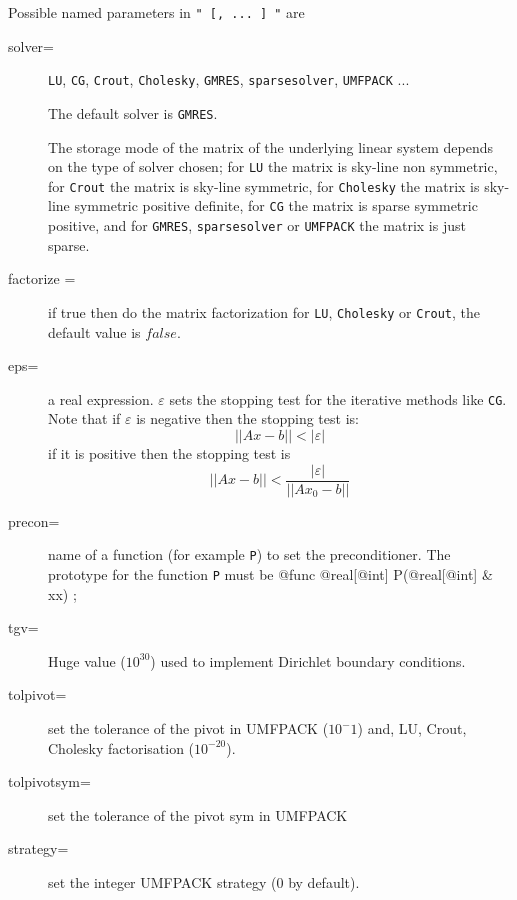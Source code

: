 \documentclass[a4paper,twoside,12pt]{book}
\begin{document}
Possible named parameters in \texttt{" [, ... ] "} are
\begin{description}
    \item[solver=]   \texttt{LU}, \texttt{CG}, 
    \texttt{Crout}, \texttt{Cholesky}, \texttt{GMRES}, \texttt{sparsesolver}, \texttt{UMFPACK} ...

    The default solver is \texttt{GMRES}.

    The storage mode of the matrix of the underlying linear system
    depends on
    the type of solver chosen; for \texttt{LU}  the matrix is sky-line non
    symmetric, for \texttt{Crout} the matrix is sky-line symmetric, for
    \texttt{Cholesky} the matrix is sky-line symmetric positive
    definite,  for \texttt{CG}   the matrix is sparse symmetric positive,
    and for \texttt{GMRES}, \texttt{sparsesolver} or \texttt{UMFPACK} the matrix is just  sparse.

    \item[factorize =]  if true then do the matrix factorization for
    \texttt{LU}, \texttt{Cholesky} or \texttt{Crout}, the default value is $false$.

    \item[eps=]     a real expression. $\varepsilon$  sets the stopping test for
    the iterative methods like \texttt{CG}. Note that if $\varepsilon$
    is negative  then the stopping test is:
    $$  || A x - b || < |\varepsilon| $$
    if it is positive then the stopping test is
        $$  || A x - b || < \frac{|\varepsilon|}{|| A x_{0} - b ||} $$


    \item[precon=]   name of a function (for example \texttt{P}) to set the preconditioner. 
    The prototype for the function \texttt{P} must be
\bFF
    @func @real[@int]  P(@real[@int] & xx) ;
\eFF
      \item[tgv=]      Huge value ($10^{30}$) used to implement
      Dirichlet boundary conditions.

      \item[tolpivot=]   set the tolerance of the pivot in UMFPACK ($10^-1$)  and, LU, Crout, Cholesky
      factorisation ($10^{-20}$).

      \item[tolpivotsym=]   set the tolerance of the pivot sym in UMFPACK
      \item[strategy=]   set the integer UMFPACK strategy  ($0$ by default).

\end{description}
\end{document}
